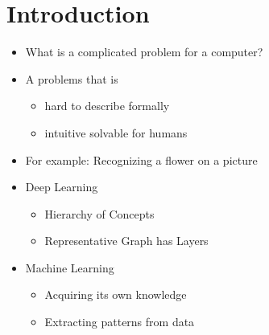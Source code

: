 \documentclass[t]{beamer} %
\begin{document}
\section{Introduction}
\begin{frame}
    \begin{itemize}[<+->]
        \item What is a complicated problem for a computer?
        \item A problems that is
        \begin{itemize}[<+->]
            \item hard to describe formally
            \item intuitive solvable for humans
        \end{itemize}
        \item For example: Recognizing a flower on a picture
        \item Deep Learning
        \begin{itemize}[<+->]
            \item Hierarchy of Concepts
            \item Representative Graph has Layers
        \end{itemize}
        \item Machine Learning
        \begin{itemize}[<+->]
            \item Acquiring its own knowledge
            \item Extracting patterns from data
        \end{itemize}
    \end{itemize}
\end{frame}
\end{document}
